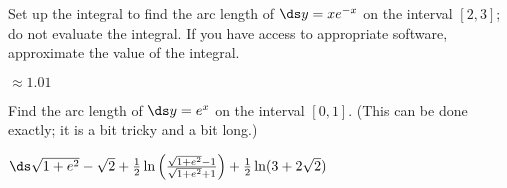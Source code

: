 \begin{enumialphparenastyle}
\begin{ex}
 Set up the integral to find the arc length of $\ds y=xe^{-x}$
on the interval $[2,3]$; do not evaluate the integral. If you have
access to appropriate software, approximate the value of the integral.
\begin{sol}
 $\approx 1.01$
\end{sol}
\end{ex}

\begin{ex}
 Find the arc length of $\ds y=e^x$ on the interval $[0,1]$.
(This can be done exactly; it is a bit tricky and a bit long.)
\begin{sol}
 $\ds \sqrt{1+e^2}-\sqrt2+
{1\over2}\ln\left({\sqrt{1+e^2}-1\over\sqrt{1+e^2}+1}\right)+
{1\over2}\ln(3+2\sqrt2)$
\end{sol}
\end{ex}

\end{enumialphparenastyle}